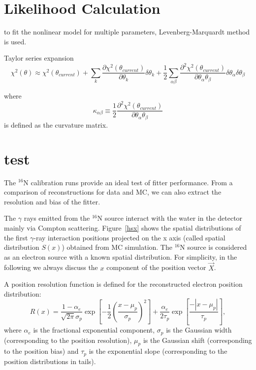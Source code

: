 \section{Likelihood Calculation}
to fit the nonlinear model for multiple parameters, Levenberg-Marquardt method is used.

Taylor series expansion
\[
\chi^2(\theta)\approx\chi^2(\theta_{current})+\sum_k\frac{\partial \chi^2(\theta_{current})}{\partial \theta_k}\delta\theta_k+\frac{1}{2}\sum_{\alpha\beta}\frac{\partial^2\chi^2(\theta_{current})}{\partial\theta_\alpha\theta_\beta}\delta\theta_\alpha\delta\theta_\beta
\]

where \[
\kappa_{\alpha\beta}\equiv \frac{1}{2} \frac{\partial^2\chi^2(\theta_{current})}{\partial\theta_\alpha\theta_\beta}
\]
is defined as the curvature matrix\cite{gregory2005bayesian}.








\section{ test}

The $^{16}$N calibration runs provide an ideal test of fitter performance. From a comparison of reconstructions for data and MC, we can also extract the resolution and bias of the fitter.

The $\gamma$ rays emitted from the $^{16}$N source interact with the water in the detector mainly via Compton scattering. Figure~\ref{hsx} shows the spatial distributions of the first $\gamma$-ray interaction positions projected on the x axis (called spatial distribution $S(x)$) obtained from MC simulation. The $^{16}$N source is considered as an electron source with a known spatial distribution\cite{boulay}. For simplicity, in the following we always discuss the $x$ component of the position vector $\vec{X}$. 


A position resolution function is defined for the reconstructed electron position distribution\cite{boulay}:
\[
R(x)=\frac{1-\alpha_e}{\sqrt{2\pi}\sigma_p}\exp{[-\frac{1}{2}(\frac{x-\mu_p}{\sigma_p})^2]+\frac{\alpha_e}{2\tau_p}\exp{[\frac{-|x-\mu_p|}{\tau_p}]}},
\]
where $\alpha_e$ is the fractional exponential component, $\sigma_p$ is
the Gaussian width (corresponding to the position resolution), $\mu_p$ is the Gaussian shift  (corresponding to the position bias) and $\tau_p$ is the exponential slope (corresponding to the position distributions in tails).

